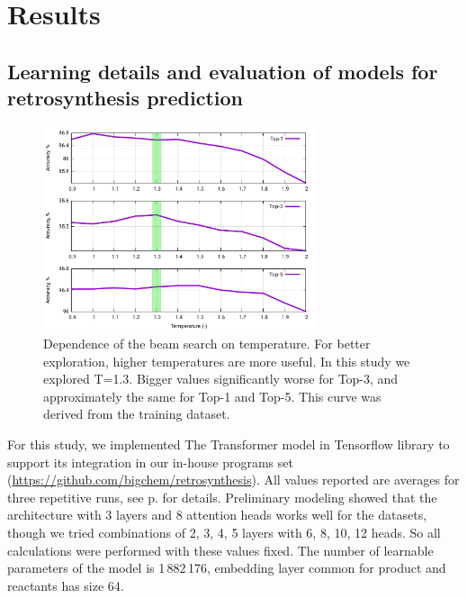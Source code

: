 \documentclass{article}
\begin{document}
\section{Results}
\label{sec:results}
\subsection {Learning details and evaluation of models for retrosynthesis prediction} 
\begin{figure}  
  \vspace{-0.5cm}
  \includegraphics[width = 8cm]{images/tempdep.pdf}
  \caption{Dependence of the beam search on temperature. For better exploration, higher temperatures are more useful. In this study we explored T=1.3. Bigger values significantly worse for Top-3, and approximately the same for Top-1 and Top-5. This curve was derived from the training dataset.}
  \label{fig:tempdep}
  \vspace{-0.5cm}
\end{figure}
For this study, we implemented The Transformer model in Tensorflow \cite{tensorflow} library to support its integration in our in-house programs set (\url{https://github.com/bigchem/retrosynthesis}).  All values reported are averages for three repetitive runs, see p. \pageref{sec:appendix} for details. Preliminary modeling showed that the architecture with 3 layers and 8 attention heads works well for the datasets, though we tried combinations of 2, 3, 4, 5 layers with 6, 8, 10, 12 heads. So all calculations were performed with these values fixed.  The number of learnable parameters of the model is 1\,882\,176, embedding layer common for product and reactants has size 64.
\end{document}
